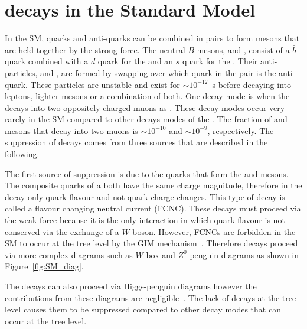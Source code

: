 \section[$B^0_{(s)}\to \mu^+ \mu^-$ decays in the Standard Model]{ decays in the Standard Model}
\label{sec:bsmumu_in_SM}
In the SM, quarks and anti-quarks can be combined in pairs to form mesons that are held together by the strong force. The neutral $B$ mesons, \bd and \bs, consist of a $\bar{b}$ quark combined with a $d$ quark for the \bd and an $s$ quark for the \bs. Their anti-particles, \barbd and \barbs, are formed by swapping over which quark in the pair is the anti-quark. These particles are unstable and exist for $\sim10^{-12}$~s before decaying into leptons, lighter mesons or a combination of both. One decay mode is when the \bsd decays into two oppositely charged muons as \bmumu. %
These decay modes occur very rarely in the SM compared to other decays modes of the \bsd. The fraction of \bd and \bs mesons that decay into two muons is $\sim10^{-10}$ and $\sim10^{-9}$, respectively. The suppression of \bmumu decays comes from three sources that are described in the following.


The first source of suppression is due to the quarks that form the \bd and \bs mesons. The composite quarks of a \bsd both have the same charge magnitude, therefore in the decay \bmumu only quark flavour and not quark charge changes. This type of decay is called a flavour changing neutral current (FCNC). These decays must proceed via the weak force because it is the only interaction in which quark flavour is not conserved via the exchange of a $W$ boson. However, FCNCs are forbidden in the SM to occur at the tree level by the GIM mechanism~\cite{PhysRevD.2.1285}. Therefore \bmumu decays proceed via more complex diagrams such as $W$-box and $Z^0$-penguin diagrams as shown in Figure~\ref{fig:SM_diag}.

The decays can also proceed via Higgs-penguin diagrams however the contributions from these diagrams are negligible~\cite{Arbey:2012ax}. %
The lack of \bmumu decays at the tree level causes them to be suppressed compared to other \bsd decay modes that can occur at the tree level.

